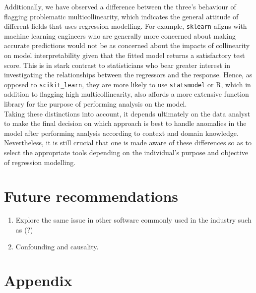 \documentclass[12pt]{article}
\begin{document}
	Additionally, we have observed a difference between the three's behaviour of flagging problematic multicollinearity, which indicates the general attitude of different fields that uses regression modelling. For example, \texttt{sklearn} aligns with machine learning engineers who are generally more concerned about making accurate predictions would not be as concerned about the impacts of collinearity on model interpretability given that the fitted model returns a satisfactory test score. This is in stark contrast to statisticians who bear greater interest in investigating the relationships between the regressors and the response. Hence, as opposed to \texttt{scikit\_learn}, they are more likely to use \texttt{statsmodel} or R, which in addition to flagging high multicollinearity, also affords a more extensive function library for the purpose of performing analysis on the model.\\
	
	Taking these distinctions into account, it depends ultimately on the data analyst to make the final decision on which approach is best to handle anomalies in the model after performing analysis according to context and domain knowledge. Nevertheless, it is still crucial that one is made aware of these differences so as to select the appropriate tools depending on the individual's purpose and objective of regression modelling. 
	
	\section{Future recommendations}
	\begin{enumerate}
		\item Explore the same issue in other software commonly used in the industry such as (?)
		\item Confounding and causality.
	\end{enumerate}
	\section{Appendix}
\end{document}
